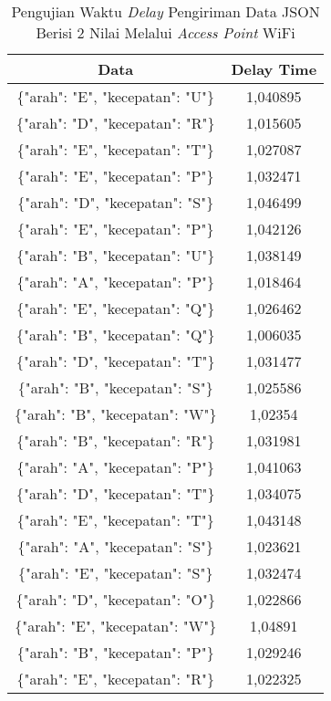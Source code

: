 \begin{table}[!ht]
  \centering
  \caption{Pengujian Waktu \emph{Delay} Pengiriman Data JSON Berisi 2 Nilai Melalui \emph{Access Point} WiFi}
  \label{tbl:delayWiFiJSON}
  \begin{tabular}{|c|c|}
  \hline
  Data                              & Delay Time  \\ \hline
  \{"arah": "E", "kecepatan": "U"\} & 1,040895    \\ \hline
  \{"arah": "D", "kecepatan": "R"\} & 1,015605    \\ \hline
  \{"arah": "E", "kecepatan": "T"\} & 1,027087    \\ \hline
  \{"arah": "E", "kecepatan": "P"\} & 1,032471    \\ \hline
  \{"arah": "D", "kecepatan": "S"\} & 1,046499    \\ \hline
  \{"arah": "E", "kecepatan": "P"\} & 1,042126    \\ \hline
  \{"arah": "B", "kecepatan": "U"\} & 1,038149    \\ \hline
  \{"arah": "A", "kecepatan": "P"\} & 1,018464    \\ \hline
  \{"arah": "E", "kecepatan": "Q"\} & 1,026462    \\ \hline
  \{"arah": "B", "kecepatan": "Q"\} & 1,006035    \\ \hline
  \{"arah": "D", "kecepatan": "T"\} & 1,031477    \\ \hline
  \{"arah": "B", "kecepatan": "S"\} & 1,025586    \\ \hline
  \{"arah": "B", "kecepatan": "W"\} & 1,02354     \\ \hline
  \{"arah": "B", "kecepatan": "R"\} & 1,031981    \\ \hline
  \{"arah": "A", "kecepatan": "P"\} & 1,041063    \\ \hline
  \{"arah": "D", "kecepatan": "T"\} & 1,034075    \\ \hline
  \{"arah": "E", "kecepatan": "T"\} & 1,043148    \\ \hline
  \{"arah": "A", "kecepatan": "S"\} & 1,023621    \\ \hline
  \{"arah": "E", "kecepatan": "S"\} & 1,032474    \\ \hline
  \{"arah": "D", "kecepatan": "O"\} & 1,022866    \\ \hline
  \{"arah": "E", "kecepatan": "W"\} & 1,04891     \\ \hline
  \{"arah": "B", "kecepatan": "P"\} & 1,029246    \\ \hline
  \{"arah": "E", "kecepatan": "R"\} & 1,022325    \\ \hline

\end{tabular}
\end{table}
